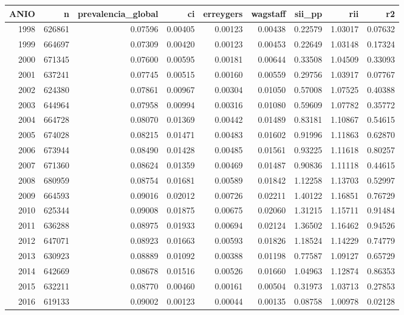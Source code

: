 \begin{tabular}{rrrrrrrrr}
\toprule
ANIO & n & prevalencia\_global & ci & erreygers & wagstaff & sii\_pp & rii & r2 \\
\midrule
1998 & 626861 & 0.07596 & 0.00405 & 0.00123 & 0.00438 & 0.22579 & 1.03017 & 0.07632 \\
1999 & 664697 & 0.07309 & 0.00420 & 0.00123 & 0.00453 & 0.22649 & 1.03148 & 0.17324 \\
2000 & 671345 & 0.07600 & 0.00595 & 0.00181 & 0.00644 & 0.33508 & 1.04509 & 0.33093 \\
2001 & 637241 & 0.07745 & 0.00515 & 0.00160 & 0.00559 & 0.29756 & 1.03917 & 0.07767 \\
2002 & 624380 & 0.07861 & 0.00967 & 0.00304 & 0.01050 & 0.57008 & 1.07525 & 0.40388 \\
2003 & 644964 & 0.07958 & 0.00994 & 0.00316 & 0.01080 & 0.59609 & 1.07782 & 0.35772 \\
2004 & 664728 & 0.08070 & 0.01369 & 0.00442 & 0.01489 & 0.83181 & 1.10867 & 0.54615 \\
2005 & 674028 & 0.08215 & 0.01471 & 0.00483 & 0.01602 & 0.91996 & 1.11863 & 0.62870 \\
2006 & 673944 & 0.08490 & 0.01428 & 0.00485 & 0.01561 & 0.93225 & 1.11618 & 0.80257 \\
2007 & 671360 & 0.08624 & 0.01359 & 0.00469 & 0.01487 & 0.90836 & 1.11118 & 0.44615 \\
2008 & 680959 & 0.08754 & 0.01681 & 0.00589 & 0.01842 & 1.12258 & 1.13703 & 0.52997 \\
2009 & 664593 & 0.09016 & 0.02012 & 0.00726 & 0.02211 & 1.40122 & 1.16851 & 0.76729 \\
2010 & 625344 & 0.09008 & 0.01875 & 0.00675 & 0.02060 & 1.31215 & 1.15711 & 0.91484 \\
2011 & 636288 & 0.08975 & 0.01933 & 0.00694 & 0.02124 & 1.36502 & 1.16462 & 0.94526 \\
2012 & 647071 & 0.08923 & 0.01663 & 0.00593 & 0.01826 & 1.18524 & 1.14229 & 0.74779 \\
2013 & 630923 & 0.08889 & 0.01092 & 0.00388 & 0.01198 & 0.77587 & 1.09127 & 0.65729 \\
2014 & 642669 & 0.08678 & 0.01516 & 0.00526 & 0.01660 & 1.04963 & 1.12874 & 0.86353 \\
2015 & 632211 & 0.08770 & 0.00460 & 0.00161 & 0.00504 & 0.31973 & 1.03713 & 0.27853 \\
2016 & 619133 & 0.09002 & 0.00123 & 0.00044 & 0.00135 & 0.08758 & 1.00978 & 0.02128 \\

\end{tabular}
